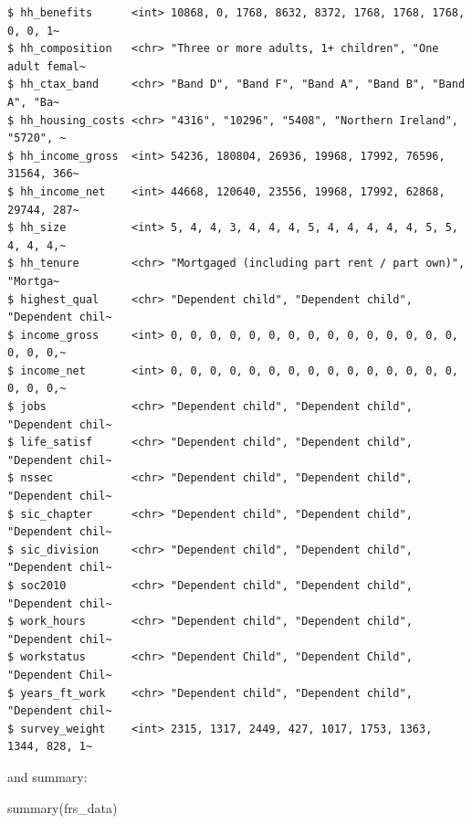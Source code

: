 \documentclass[
  letterpaper,
  DIV=11,
  numbers=noendperiod]{scrreprt}
\newenvironment{Shaded}{\begin{snugshade}}{\end{snugshade}}
\newcommand{\FunctionTok}[1]{\textcolor[rgb]{0.28,0.35,0.67}{#1}}
\newcommand{\NormalTok}[1]{\textcolor[rgb]{0.00,0.23,0.31}{#1}}
\begin{document}
\begin{verbatim}
$ hh_benefits      <int> 10868, 0, 1768, 8632, 8372, 1768, 1768, 1768, 0, 0, 1~
$ hh_composition   <chr> "Three or more adults, 1+ children", "One adult femal~
$ hh_ctax_band     <chr> "Band D", "Band F", "Band A", "Band B", "Band A", "Ba~
$ hh_housing_costs <chr> "4316", "10296", "5408", "Northern Ireland", "5720", ~
$ hh_income_gross  <int> 54236, 180804, 26936, 19968, 17992, 76596, 31564, 366~
$ hh_income_net    <int> 44668, 120640, 23556, 19968, 17992, 62868, 29744, 287~
$ hh_size          <int> 5, 4, 4, 3, 4, 4, 4, 5, 4, 4, 4, 4, 4, 5, 5, 4, 4, 4,~
$ hh_tenure        <chr> "Mortgaged (including part rent / part own)", "Mortga~
$ highest_qual     <chr> "Dependent child", "Dependent child", "Dependent chil~
$ income_gross     <int> 0, 0, 0, 0, 0, 0, 0, 0, 0, 0, 0, 0, 0, 0, 0, 0, 0, 0,~
$ income_net       <int> 0, 0, 0, 0, 0, 0, 0, 0, 0, 0, 0, 0, 0, 0, 0, 0, 0, 0,~
$ jobs             <chr> "Dependent child", "Dependent child", "Dependent chil~
$ life_satisf      <chr> "Dependent child", "Dependent child", "Dependent chil~
$ nssec            <chr> "Dependent child", "Dependent child", "Dependent chil~
$ sic_chapter      <chr> "Dependent child", "Dependent child", "Dependent chil~
$ sic_division     <chr> "Dependent child", "Dependent child", "Dependent chil~
$ soc2010          <chr> "Dependent child", "Dependent child", "Dependent chil~
$ work_hours       <chr> "Dependent child", "Dependent child", "Dependent chil~
$ workstatus       <chr> "Dependent Child", "Dependent Child", "Dependent Chil~
$ years_ft_work    <chr> "Dependent child", "Dependent child", "Dependent chil~
$ survey_weight    <int> 2315, 1317, 2449, 427, 1017, 1753, 1363, 1344, 828, 1~
\end{verbatim}

and summary:

\begin{Shaded}
\begin{Highlighting}[]
\FunctionTok{summary}\NormalTok{(frs\_data)}
\end{Highlighting}
\end{Shaded}
\end{document}
